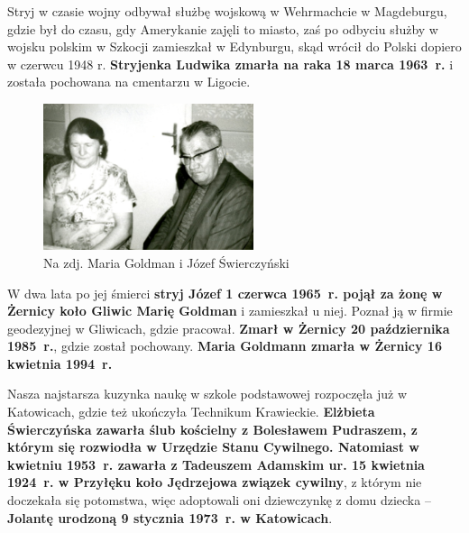 Stryj w czasie wojny odbywał służbę wojskową w Wehrmachcie w Magdeburgu, gdzie był do czasu, gdy Amerykanie zajęli to miasto, zaś po odbyciu służby w wojsku polskim w Szkocji zamieszkał w Edynburgu, skąd wrócił do Polski dopiero w czerwcu 1948 r. \textbf{Stryjenka Ludwika zmarła na raka 18 marca 1963~r.} i została pochowana na cmentarzu w Ligocie.

\begin{figure}[!h]
\begin{center}
\includegraphics[width=0.55\textwidth]{photo/jozef_maria_swierczynscy.jpg}
\caption{Na zdj. Maria Goldman i Józef Świerczyński}
\label{rys:jozef_maria_swierczynscy}
\end{center}
\end{figure}

W dwa lata po jej śmierci \textbf{stryj Józef 1 czerwca 1965~r. pojął za żonę w Żernicy koło Gliwic Marię Goldman} i zamieszkał u niej. Poznał ją w firmie geodezyjnej w Gliwicach, gdzie pracował. \textbf{Zmarł w Żernicy 20 października 1985~r.}, gdzie  został pochowany. \textbf{Maria Goldmann zmarła w Żernicy 16 kwietnia 1994~r.}

Nasza najstarsza kuzynka naukę w szkole podstawowej rozpoczęła już w Katowicach, gdzie też ukończyła Technikum Krawieckie. \textbf{Elżbieta Świerczyńska zawarła ślub kościelny z Bolesławem Pudraszem, z którym się rozwiodła w Urzędzie Stanu Cywilnego. Natomiast w kwietniu 1953~r. zawarła z Tadeuszem Adamskim ur. 15 kwietnia 1924~r. w Przyłęku koło Jędrzejowa związek cywilny}, z którym nie doczekała się potomstwa, więc adoptowali oni dziewczynkę z domu dziecka -- \textbf{Jolantę urodzoną 9 stycznia 1973~r. w Katowicach}. 


